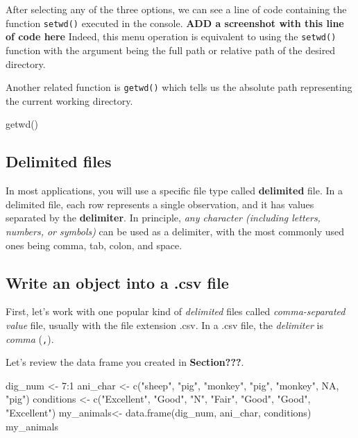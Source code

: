 \documentclass[
]{book}
\newenvironment{Shaded}{\begin{snugshade}}{\end{snugshade}}
\newcommand{\ConstantTok}[1]{\textcolor[rgb]{0.00,0.00,0.00}{#1}}
\newcommand{\DecValTok}[1]{\textcolor[rgb]{0.00,0.00,0.81}{#1}}
\newcommand{\FunctionTok}[1]{\textcolor[rgb]{0.00,0.00,0.00}{#1}}
\newcommand{\NormalTok}[1]{#1}
\newcommand{\OtherTok}[1]{\textcolor[rgb]{0.56,0.35,0.01}{#1}}
\newcommand{\SpecialCharTok}[1]{\textcolor[rgb]{0.00,0.00,0.00}{#1}}
\newcommand{\StringTok}[1]{\textcolor[rgb]{0.31,0.60,0.02}{#1}}
\begin{document}
After selecting any of the three options, we can see a line of code containing the function \texttt{setwd()} executed in the console. \textbf{ADD a screenshot with this line of code here} Indeed, this menu operation is equivalent to using the \texttt{setwd()} function with the argument being the full path or relative path of the desired directory.

Another related function is \texttt{getwd()} which tells us the absolute path representing the current working directory.

\begin{Shaded}
\begin{Highlighting}[]
\FunctionTok{getwd}\NormalTok{()}
\end{Highlighting}
\end{Shaded}

\hypertarget{delimited-files}{%
\subsection{Delimited files}\label{delimited-files}}

In most applications, you will use a specific file type called \textbf{delimited} file. In a delimited file, each row represents a single observation, and it has values separated by the \textbf{delimiter}. In principle, \emph{any character (including letters, numbers, or symbols)} can be used as a delimiter, with the most commonly used ones being comma, tab, colon, and space.

\hypertarget{write-an-object-into-a-.csv-file}{%
\subsection{Write an object into a .csv file}\label{write-an-object-into-a-.csv-file}}

First, let's work with one popular kind of \emph{delimited} files called \emph{comma-separated value} file, usually with the file extension .csv. In a .csv file, the \emph{delimiter} is \emph{comma} (\texttt{,}).

Let's review the data frame you created in \textbf{Section???}.

\begin{Shaded}
\begin{Highlighting}[]
\NormalTok{dig\_num }\OtherTok{\textless{}{-}} \DecValTok{7}\SpecialCharTok{:}\DecValTok{1}
\NormalTok{ani\_char }\OtherTok{\textless{}{-}} \FunctionTok{c}\NormalTok{(}\StringTok{"sheep"}\NormalTok{, }\StringTok{"pig"}\NormalTok{, }\StringTok{"monkey"}\NormalTok{, }\StringTok{"pig"}\NormalTok{, }\StringTok{"monkey"}\NormalTok{, }\ConstantTok{NA}\NormalTok{, }\StringTok{"pig"}\NormalTok{)}
\NormalTok{conditions }\OtherTok{\textless{}{-}} \FunctionTok{c}\NormalTok{(}\StringTok{"Excellent"}\NormalTok{, }\StringTok{"Good"}\NormalTok{, }\StringTok{"N"}\NormalTok{, }\StringTok{"Fair"}\NormalTok{, }\StringTok{"Good"}\NormalTok{, }\StringTok{"Good"}\NormalTok{, }\StringTok{"Excellent"}\NormalTok{)}
\NormalTok{my\_animals}\OtherTok{\textless{}{-}} \FunctionTok{data.frame}\NormalTok{(dig\_num, ani\_char, conditions)}
\NormalTok{my\_animals}
\end{Highlighting}
\end{Shaded}
\end{document}
